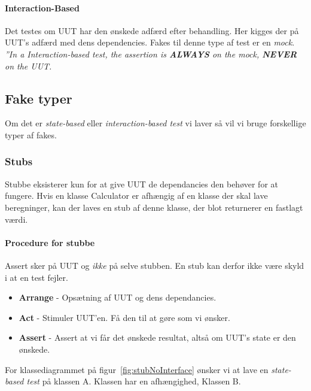 \paragraph{Interaction-Based} Det testes om UUT har den ønskede adfærd efter behandling. Her kigges der på UUT's adfærd med dens dependencies. Fakes til denne type af test er en \textit{mock}.\\

\textit{''In a Interaction-based test, the assertion is \textbf{ALWAYS} on the mock, \textbf{NEVER} on the UUT.}

\subsection{Fake typer}
Om det er \textit{state-based} eller \textit{interaction-based test} vi laver så vil vi bruge forskellige typer af fakes.

\subsubsection{Stubs}
Stubbe eksisterer kun for at give UUT de dependancies den behøver for at fungere.
Hvis en klasse Calculator er afhængig af en klasse der skal lave beregninger, kan der laves en stub af denne klasse, der blot returnerer en fastlagt værdi.

\paragraph{Procedure for stubbe} Assert sker på UUT og \textit{ikke} på selve stubben. En stub kan derfor ikke være skyld i at en test fejler.

\begin{itemize}
	\item \textbf{Arrange} - Opsætning af UUT og dens dependancies.
	\item \textbf{Act} - Stimuler UUT'en. Få den til at gøre som vi ønsker.
	\item \textbf{Assert} - Assert at vi får det ønskede resultat, altså om UUT's state er den ønskede.
\end{itemize}


For klassediagrammet på figur~\ref{fig:stubNoInterface} ønsker vi at lave en \textit{state-based test} på klassen A. Klassen har en afhængighed, Klassen B.

